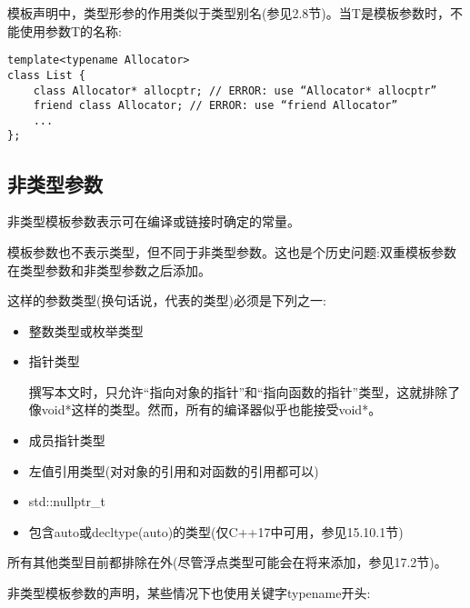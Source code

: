 模板声明中，类型形参的作用类似于类型别名(参见2.8节)。当T是模板参数时，不能使用参数T的名称:

\begin{lstlisting}[style=styleCXX]
template<typename Allocator>
class List {
	class Allocator* allocptr; // ERROR: use “Allocator* allocptr”
	friend class Allocator; // ERROR: use “friend Allocator”
	...
};
\end{lstlisting}

\subsection{非类型参数}

非类型模板参数表示可在编译或链接时确定的常量。

\begin{tcolorbox}[colback=webgreen!5!white,colframe=webgreen!75!black]
\hspace*{0.75cm}模板参数也不表示类型，但不同于非类型参数。这也是个历史问题:双重模板参数在类型参数和非类型参数之后添加。
\end{tcolorbox}

这样的参数类型(换句话说，代表的类型)必须是下列之一:

\begin{itemize}
\item 
整数类型或枚举类型

\item 
指针类型

\begin{tcolorbox}[colback=webgreen!5!white,colframe=webgreen!75!black]
\hspace*{0.75cm}撰写本文时，只允许“指向对象的指针”和“指向函数的指针”类型，这就排除了像void*这样的类型。然而，所有的编译器似乎也能接受void*。
\end{tcolorbox}

\item 
成员指针类型

\item
左值引用类型(对对象的引用和对函数的引用都可以)

\item 
std::nullptr\_t

\item 
包含auto或decltype(auto)的类型(仅C++17中可用，参见15.10.1节)
\end{itemize}

所有其他类型目前都排除在外(尽管浮点类型可能会在将来添加，参见17.2节)。

非类型模板参数的声明，某些情况下也使用关键字typename开头:

